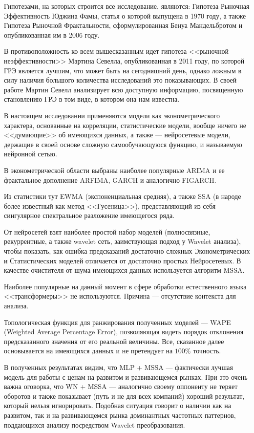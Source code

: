 Гипотезами, на которых строится все исследование, являются: Гипотеза Рыночная Эффективность Юджина Фамы, статья о которой выпущена в 1970 году, а также Гипотеза Рыночной Фрактальности, сформулированная Бенуа Мандельбротом и опубликованная им в 2006 году.

В противоположность ко всем вышесказанным идет гипотеза <<рыночной неэффективности>> Мартина Севелла, опубликованная в 2011 году, по которой ГРЭ является лучшим, что может быть на сегодняшний день, однако ложным в силу наличия большого количества исследований это показывающих. В своей работе Мартин Севелл анализирует всю доступную информацию, посвященную становлению ГРЭ в том виде, в котором она нам известна.

В настоящем исследовании применяются модели как эконометрического характера, основанные на корреляции, статистические модели, вообще ничего не <<думающие>> об имеющихся данных, а также --- нейросетевые модели, держащие в своей основе сложную самообучающуюся функцию, и называемую нейронной сетью. 

В эконометрической области выбраны наиболее популярные ARIMA и ее фрактальное дополнение ARFIMA, GARCH и аналогично FIGARCH.

Из статистики тут EWMA (экспоненциальная средняя), а также SSA (в народе более известный как метод <<Гусеница>>), представляющий из себя сингулярное спектральное разложение имеющегося ряда.

От нейросетей взят наиболее простой набор моделей (полносвязные, рекуррентные, а также wavelet сеть, заимствующая подход у Wavelet анализа), чтобы показать, как ошибка предсказаний достаточно сложных Эконометрических и Статистических моделей отличается от достаточно простых Нейросетевых. В качестве очистителя от шума имеющихся данных используется алгоритм MSSA.

Наиболее популярные на данный момент в сфере обработки естественного языка <<трансформеры>> не используются. Причина --- отсутствие контекста для анализа.

Топологическая функция для ранжирования полученных моделей --- WAPE (Weighted Average Percentage Error), позволяющая видеть порядок отклонения предсказанного значения от его реальной величины. Все, сказанное далее основывается на имеющихся данных и не претендует на $100\%$ точность.

В полученных результатах видим, что MLP + MSSA --- фактически лучшая модель для работы с ценам на развитом и развивающемся рынках. При это очень важна оговорка, что WN + MSSA --- аналогично своему оппоненту не теряет оборотов и также показывает (путь и не для всех компаний) хороший результат, который нельзя игнорировать. Подобная ситуация говорит о наличии как на развитом, так и на развивающемся рынка доминантных частотных паттернов, поддающихся анализу посредством Wavelet преобразования.

